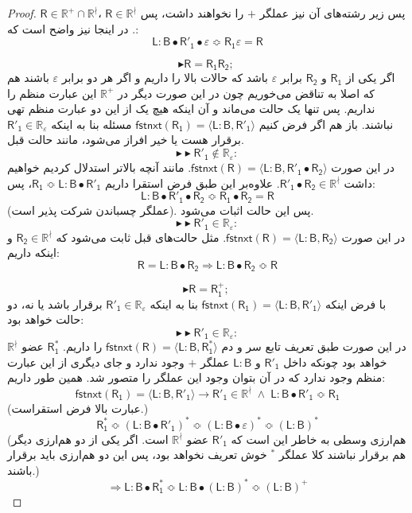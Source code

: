 \begin{proof}
$\mathsf{R} \in \mathbb{R^+ \cap R^\nmid}$،
پس زیر رشته‌های آن نیز عملگر $+$ را نخواهند داشت، پس 
$\mathsf{R} \in \mathbb{R^\nmid}$.
در اینجا نیز واضح است که:
$$\mathsf{L:B \bullet R'_1 \bullet \varepsilon \Bumpeq R_1 \varepsilon = R }$$


	
	$$\blacktriangleright\mathsf{R=R_1 R_2;\:}$$
	اگر یکی از $\mathsf{R_1}$ و $\mathsf{R_2}$ برابر $\varepsilon$ باشد که حالات بالا را داریم و اگر هر دو برابر $\varepsilon$ باشند هم که اصلا به تناقض می‌خوریم چون در این صورت دیگر در $\mathbb{R^+}$ این عبارت منظم را نداریم. پس تنها یک حالت می‌ماند و آن اینکه هیچ یک از این دو عبارت منظم تهی نباشند. باز هم اگر فرض کنیم 
	$\mathsf{fstnxt(R_1)=\langle L:B , R'_1 \rangle}$
	مسئله بنا به اینکه 
	$\mathsf{R'_1} \in \mathbb{R_\varepsilon}$
	برقرار هست یا خیر افراز می‌شود، مانند حالت قبل.
	$$\blacktriangleright\blacktriangleright \mathsf{R'_1} \notin \mathbb{R_\varepsilon}: $$
	در این صورت 
	$\mathsf{fstnxt(R)=\langle L:B , R'_1 \bullet R_2}\rangle$.
	مانند آنچه بالاتر استدلال کردیم خواهیم داشت 
	$\mathsf{R'_1 \bullet R_2 \in } \mathbb{R^\nmid}$.
	علاوه‌بر این طبق فرض استقرا داریم 
	$\mathsf{ R_1 \Bumpeq L:B \bullet R'_1 }$،
	پس:
	$$\mathsf{L:B \bullet R'_1 \bullet R_2 \Bumpeq R_1 \bullet R_2 = R}$$
	(عملگر چسباندن شرکت پذیر است). پس این حالت اثبات می‌شود.
	$$\blacktriangleright\blacktriangleright \mathsf{R'_1} \in \mathbb{R_\varepsilon}: $$
	در این صورت 
	$\mathsf{fstnxt(R)=\langle L:B , R_2 \rangle}$.
	مثل حالت‌های قبل ثابت می‌شود که $\mathsf{R_2} \in \mathbb{R^\nmid}$ و اینکه داریم:
	$$\mathsf{R = L:B \bullet R_2 \Rightarrow L:B \bullet R_2 \Bumpeq R}$$ 
	
	$$\blacktriangleright\mathsf{R=R_1^+;\:}$$
	با فرض اینکه 
	$\mathsf{fstnxt(R_1)=\langle L:B , R'_1 \rangle}$
		بنا به اینکه 
	$\mathsf{R'_1} \in \mathbb{R_\varepsilon}$
	برقرار باشد یا نه، دو حالت خواهد بود:
	$$\blacktriangleright\blacktriangleright\mathsf{R'_1} \in \mathbb{R_\varepsilon}:$$
	در این صورت طبق تعریف تابع سر و دم
	$\mathsf{fstnxt(R)=\langle L:B , R^*_1 \rangle}$
	را داریم. 
	$\mathsf{R_1^*}$
	عضو 
	$\mathbb{R^\nmid}$ 
	خواهد بود چونکه  داخل 
	$\mathsf{R'_1}$
	و 
	$\mathsf{L:B}$
	عملگر $+$ وجود ندارد و جای دیگری از این عبارت منظم وجود ندارد که در آن بتوان وجود این عملگر را متصور شد. همین طور داریم:
	$$\mathsf{fstnxt(R_1) = \langle L:B , R'_1 \rangle \rightarrow
		R'_1 \in \mathbb{R^\nmid}\; \land \; L:B \bullet R'_1 \Bumpeq R_1}$$
		(عبارت بالا فرض استقراست.)
	$$\mathsf{R_1^* \Bumpeq (L:B \bullet R'_1)^* \Bumpeq (L:B \bullet \varepsilon)^* \Bumpeq (L:B)^*}$$
	(هم‌ارزی وسطی به خاطر این است که $\mathsf{R'_1}$ عضو $\mathbb{R^\nmid}$ است. اگر یکی از دو هم‌ارزی‌ دیگر هم برقرار نباشند کلا عملگر $ ^*$ خوش تعریف نخواهد بود، پس این دو هم‌ارزی باید برقرار باشند.)
	$$\Rightarrow \mathsf{L:B\bullet R_1^* \Bumpeq L:B \bullet (L:B)^* \Bumpeq 
	(L:B)^+}$$


\end{proof}
